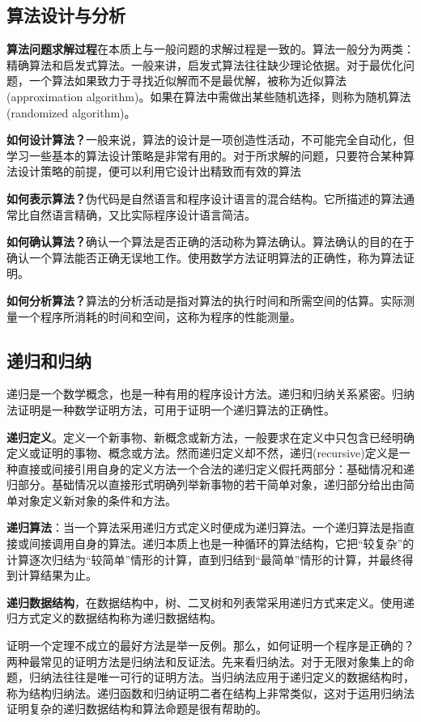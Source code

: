 \subsection*{算法设计与分析} 
\textbf{算法问题求解过程}在本质上与一般问题的求解过程是一致的。算法一般分为两类：精确算法和启发式算法。一般来讲，启发式算法往往缺少理论依据。对于最优化问题，一个算法如果致力于寻找近似解而不是最优解，被称为近似算法(approximation algorithm)。如果在算法中需做出某些随机选择，则称为随机算法(randomized algorithm)。

\textbf{如何设计算法？}一般来说，算法的设计是一项创造性活动，不可能完全自动化，但学习一些基本的算法设计策略是非常有用的。对于所求解的问题，只要符合某种算法设计策略的前提，便可以利用它设计出精致而有效的算法

\textbf{如何表示算法？}伪代码是自然语言和程序设计语言的混合结构。它所描述的算法通常比自然语言精确，又比实际程序设计语言简洁。

\textbf{如何确认算法？}确认一个算法是否正确的活动称为算法确认。算法确认的目的在于确认一个算法能否正确无误地工作。使用数学方法证明算法的正确性，称为算法证明。 

\textbf{如何分析算法？}算法的分析活动是指对算法的执行时间和所需空间的估算。实际测量一个程序所消耗的时间和空间，这称为程序的性能测量。

\subsection*{递归和归纳}
递归是一个数学概念，也是一种有用的程序设计方法。递归和归纳关系紧密。归纳法证明是一种数学证明方法，可用于证明一个递归算法的正确性。

\textbf{递归定义}。定义一个新事物、新概念或新方法，一般要求在定义中只包含已经明确定义或证明的事物、概念或方法。然而递归定义却不然，递归(recursive)定义是一种直接或间接引用自身的定义方法一个合法的递归定义假托两部分：基础情况和递归部分。基础情况以直接形式明确列举新事物的若干简单对象，递归部分给出由简单对象定义新对象的条件和方法。

\textbf{递归算法}：当一个算法采用递归方式定义时便成为递归算法。一个递归算法是指直接或间接调用自身的算法。递归本质上也是一种循环的算法结构，它把“较复杂”的计算逐次归结为“较简单”情形的计算，直到归结到“最简单”情形的计算，并最终得到计算结果为止。

\textbf{递归数据结构}，在数据结构中，树、二叉树和列表常采用递归方式来定义。使用递归方式定义的数据结构称为递归数据结构。

证明一个定理不成立的最好方法是举一反例。那么，如何证明一个程序是正确的？两种最常见的证明方法是归纳法和反证法。先来看归纳法。对于无限对象集上的命题，归纳法往往是唯一可行的证明方法。当归纳法应用于递归定义的数据结构时，称为结构归纳法。递归函数和归纳证明二者在结构上非常类似，这对于运用归纳法证明复杂的递归数据结构和算法命题是很有帮助的。

